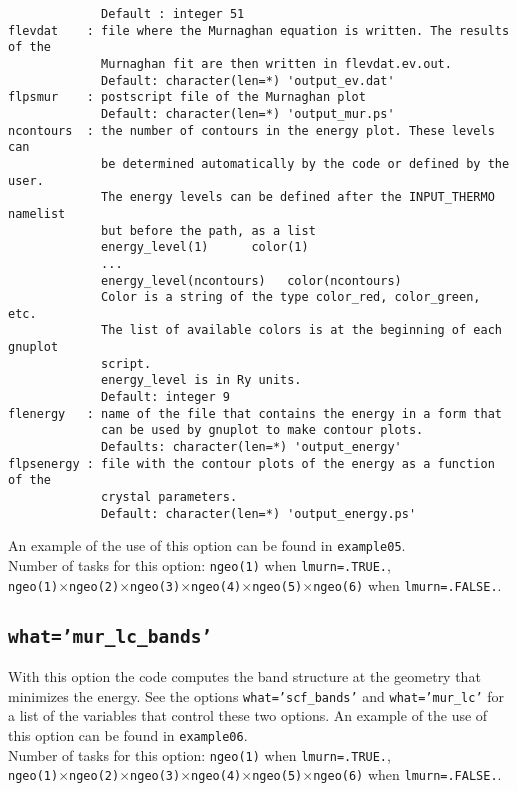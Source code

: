 \documentclass[12pt,a4paper]{article}
\begin{document}
\begin{verbatim}
             Default : integer 51
flevdat    : file where the Murnaghan equation is written. The results of the
             Murnaghan fit are then written in flevdat.ev.out.
             Default: character(len=*) 'output_ev.dat'
flpsmur    : postscript file of the Murnaghan plot
             Default: character(len=*) 'output_mur.ps'
ncontours  : the number of contours in the energy plot. These levels can
             be determined automatically by the code or defined by the user.
             The energy levels can be defined after the INPUT_THERMO namelist 
             but before the path, as a list
             energy_level(1)      color(1)
             ...
             energy_level(ncontours)   color(ncontours) 
             Color is a string of the type color_red, color_green, etc.
             The list of available colors is at the beginning of each gnuplot
             script.
             energy_level is in Ry units.
             Default: integer 9
flenergy   : name of the file that contains the energy in a form that
             can be used by gnuplot to make contour plots.
             Defaults: character(len=*) 'output_energy'
flpsenergy : file with the contour plots of the energy as a function of the
             crystal parameters.
             Default: character(len=*) 'output_energy.ps'
\end{verbatim}
An example of the use of this option can be found in \texttt{example05}.\\
Number of tasks for this option: 
\texttt{ngeo(1)} when \texttt{lmurn=.TRUE.}, \\
\texttt{ngeo(1)}$\times$\texttt{ngeo(2)}$\times$\texttt{ngeo(3)}$\times$\texttt{ngeo(4)}$\times$\texttt{ngeo(5)}$\times$\texttt{ngeo(6)} when 
\texttt{lmurn=.FALSE.}.


\subsection{\texttt{what='mur\_lc\_bands'}}
With this option the code computes the band structure at the geometry 
that minimizes the energy. See the options 
\texttt{what='scf\_bands'} and \texttt{what='mur\_lc'} for a list of 
the variables that control these two options. An example of the use of 
this option can be found in \texttt{example06}. \\
Number of tasks for this option: 
\texttt{ngeo(1)} when \texttt{lmurn=.TRUE.}, \\
\texttt{ngeo(1)}$\times$\texttt{ngeo(2)}$\times$\texttt{ngeo(3)}$\times$\texttt{ngeo(4)}$\times$\texttt{ngeo(5)}$\times$\texttt{ngeo(6)} when 
\texttt{lmurn=.FALSE.}.
\end{document}
